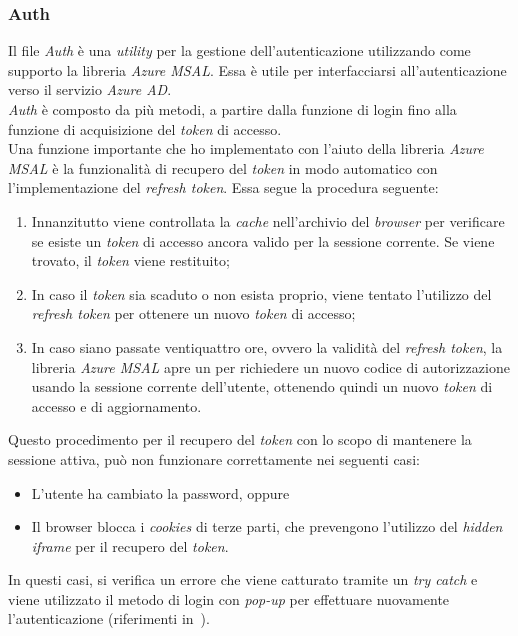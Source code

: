 \subsubsection{Auth}\label{subsubsec:auth-utils}
Il file \textit{Auth} è una \textit{utility} per la gestione dell'autenticazione utilizzando come supporto la libreria \textit{Azure MSAL}. Essa è utile
per interfacciarsi all'autenticazione verso il servizio \textit{Azure AD}.\\
\textit{Auth} è composto da più metodi, a partire dalla funzione di login fino alla funzione di acquisizione del \textit{token} di accesso.\\
Una funzione importante che ho implementato con l'aiuto della libreria \textit{Azure MSAL} è la funzionalità di recupero del \textit{token} in modo automatico con 
l'implementazione del \textit{refresh token}. Essa segue la procedura seguente:
\begin{enumerate}
  \item Innanzitutto viene controllata la \textit{cache} nell'archivio del \textit{browser} per verificare se esiste un \textit{token} di accesso ancora valido per la sessione corrente. Se viene trovato, il \textit{token} viene restituito;
  \item In caso il \textit{token} sia scaduto o non esista proprio, viene tentato l'utilizzo del \textit{refresh token} per ottenere un nuovo \textit{token} di accesso;
  \item In caso siano passate ventiquattro ore, ovvero la validità del \textit{refresh token}, la libreria \textit{Azure MSAL} apre un  per richiedere
  un nuovo codice di autorizzazione usando la sessione corrente dell'utente, ottenendo quindi un nuovo \textit{token} di accesso e di aggiornamento. 
\end{enumerate}
Questo procedimento per il recupero del \textit{token} con lo scopo di mantenere la sessione attiva, può non funzionare correttamente nei seguenti casi:
\begin{itemize}
  \item L'utente ha cambiato la password, oppure
  \item Il browser blocca i \textit{cookies} di terze parti, che prevengono l'utilizzo del \textit{hidden iframe} per il recupero del \textit{token}.
\end{itemize}
In questi casi, si verifica un errore che viene catturato tramite un \textit{try catch} e viene utilizzato il metodo di login con \textit{pop-up} per effettuare nuovamente l'autenticazione (riferimenti in~\cite{site:token}).
